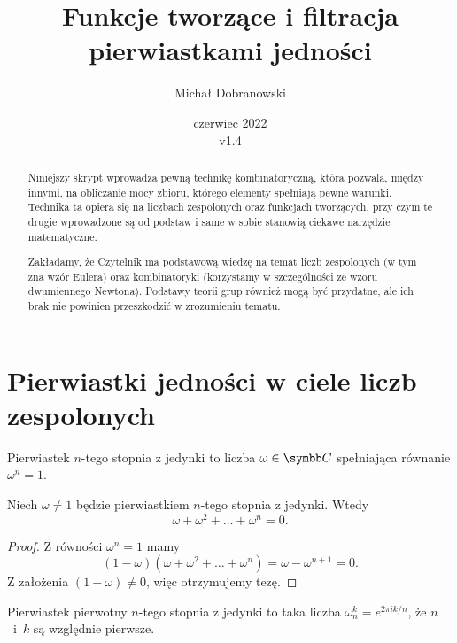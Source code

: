 \documentclass[bibliography=totocnumbered]{scrartcl}
\title{Funkcje tworzące i filtracja pierwiastkami jedności}
\author{Michał Dobranowski}
\date{czerwiec 2022 \\ v1.4}
\begin{document}
    \maketitle
    \begin{abstract}
        \noindent Niniejszy skrypt wprowadza pewną technikę kombinatoryczną, która pozwala, między innymi, na obliczanie mocy zbioru, którego elementy spełniają pewne warunki. Technika ta opiera się na liczbach zespolonych oraz funkcjach tworzących, przy czym te drugie wprowadzone są od podstaw i same w sobie stanowią ciekawe narzędzie matematyczne.

        Zakładamy, że Czytelnik ma podstawową wiedzę na temat liczb zespolonych (w tym zna wzór Eulera) oraz kombinatoryki (korzystamy w szczególności ze wzoru dwumiennego Newtona). Podstawy teorii grup również mogą być przydatne, ale ich brak nie powinien przeszkodzić w zrozumieniu tematu.
    \end{abstract}
    \vspace*{\fill}
    {\footnotesize\doclicenseThis}
    \newpage

    \tableofcontents
    \newpage

\section{Pierwiastki jedności w ciele liczb zespolonych}
    \begin{definition}
        \label{d:root}
        Pierwiastek $n$-tego stopnia z jedynki to liczba $\omega \in \CC$ spełniająca równanie $\omega^n = 1$.
    \end{definition}

    \begin{lemma}
        \label{l:roots_sum}
        Niech $\omega \neq 1$ będzie pierwiastkiem $n$-tego stopnia z jedynki. Wtedy
        $$ \omega + \omega^2 + \ldots + \omega^n = 0. $$
    \end{lemma}
    \begin{proof}
        Z równości $\omega^n = 1$ mamy
        $$ (1 - \omega)(\omega + \omega^2 + \ldots + \omega^n) = \omega - \omega^{n+1} = 0. $$
        Z założenia $(1 - \omega) \neq 0$, więc otrzymujemy tezę.
    \end{proof}

    \begin{definition}
        \label{d:primitive_root}
        Pierwiastek pierwotny $n$-tego stopnia z jedynki to taka liczba $\omega_n^k = e^{2\pi i k / n}$, że $n$~i~$k$ są względnie pierwsze.
    \end{definition}
\end{document}
